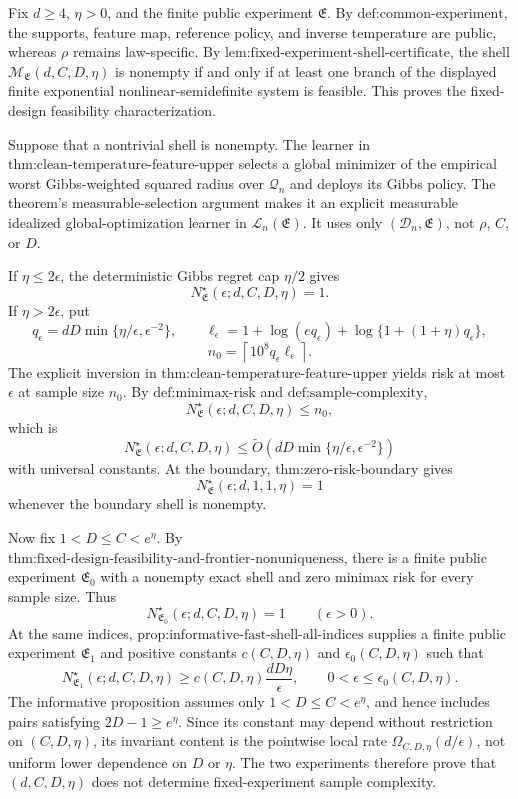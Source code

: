 Fix \(d\ge4\), \(\eta>0\), and the finite public experiment \(\mathfrak E\). By \(\text{def:common-experiment}\), the supports, feature map, reference policy, and inverse temperature are public, whereas \(\rho\) remains law-specific. By \(\text{lem:fixed-experiment-shell-certificate}\), the shell \(\mathcal M_{\mathfrak E}(d,C,D,\eta)\) is nonempty if and only if at least one branch of the displayed finite exponential nonlinear-semidefinite system is feasible. This proves the fixed-design feasibility characterization.

Suppose that a nontrivial shell is nonempty. The learner in \(\text{thm:clean-temperature-feature-upper}\) selects a global minimizer of the empirical worst Gibbs-weighted squared radius over \(\mathcal Q_n\) and deploys its Gibbs policy. The theorem's measurable-selection argument makes it an explicit measurable idealized global-optimization learner in \(\mathcal L_n(\mathfrak E)\). It uses only \((\mathcal D_n,\mathfrak E)\), not \(\rho\), \(C\), or \(D\).

If \(\eta\le2\epsilon\), the deterministic Gibbs regret cap \(\eta/2\) gives
\[
N^\star_{\mathfrak E}(\epsilon;d,C,D,\eta)=1.
\]
If \(\eta>2\epsilon\), put
\[
q_\epsilon=dD\min\{\eta/\epsilon,\epsilon^{-2}\},
\qquad
\ell_\epsilon=1+\log(eq_\epsilon)+\log\{1+(1+\eta)q_\epsilon\},
\]
\[
n_0=\left\lceil10^8q_\epsilon\ell_\epsilon\right\rceil.
\]
The explicit inversion in \(\text{thm:clean-temperature-feature-upper}\) yields risk at most \(\epsilon\) at sample size \(n_0\). By \(\text{def:minimax-risk}\) and \(\text{def:sample-complexity}\),
\[
N^\star_{\mathfrak E}(\epsilon;d,C,D,\eta)\le n_0,
\]
which is
\[
N^\star_{\mathfrak E}(\epsilon;d,C,D,\eta)
\le\widetilde O\!\left(dD\min\{\eta/\epsilon,\epsilon^{-2}\}\right)
\]
with universal constants. At the boundary, \(\text{thm:zero-risk-boundary}\) gives
\[
N^\star_{\mathfrak E}(\epsilon;d,1,1,\eta)=1
\]
whenever the boundary shell is nonempty.

Now fix \(1<D\le C<e^\eta\). By \(\text{thm:fixed-design-feasibility-and-frontier-nonuniqueness}\), there is a finite public experiment \(\mathfrak E_0\) with a nonempty exact shell and zero minimax risk for every sample size. Thus
\[
N^\star_{\mathfrak E_0}(\epsilon;d,C,D,\eta)=1
\qquad(\epsilon>0).
\]
At the same indices, \(\text{prop:informative-fast-shell-all-indices}\) supplies a finite public experiment \(\mathfrak E_1\) and positive constants \(c(C,D,\eta)\) and \(\epsilon_0(C,D,\eta)\) such that
\[
N^\star_{\mathfrak E_1}(\epsilon;d,C,D,\eta)
\ge c(C,D,\eta)\frac{dD\eta}{\epsilon},
\qquad 0<\epsilon\le\epsilon_0(C,D,\eta).
\]
The informative proposition assumes only \(1<D\le C<e^\eta\), and hence includes pairs satisfying \(2D-1\ge e^\eta\). Since its constant may depend without restriction on \((C,D,\eta)\), its invariant content is the pointwise local rate \(\Omega_{C,D,\eta}(d/\epsilon)\), not uniform lower dependence on \(D\) or \(\eta\). The two experiments therefore prove that \((d,C,D,\eta)\) does not determine fixed-experiment sample complexity.

